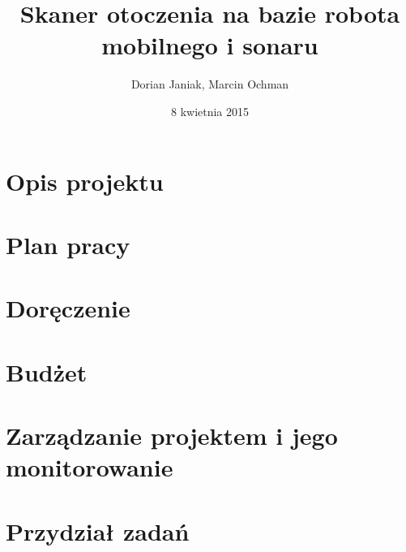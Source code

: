 \documentclass[a4paper]{article}
\begin{document}
   	\title{\vspace{50mm}Skaner otoczenia na bazie robota mobilnego i sonaru}
	\author{Dorian Janiak, Marcin Ochman}
	\date{8 kwietnia 2015}

\maketitle

\newpage

\tableofcontents

\listoftables

\newpage

\section{Opis projektu}


\section{Plan pracy}


\section{Doręczenie}


\section{Budżet}


\section{Zarządzanie projektem i jego monitorowanie}


\section{Przydział zadań}

\end{document}
